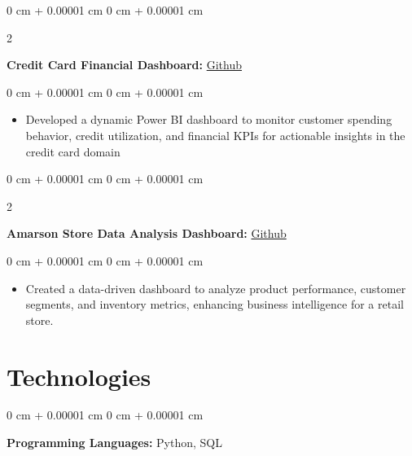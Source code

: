 \documentclass[10pt, letterpaper]{article}
\newenvironment{highlights}{
    \begin{itemize}[
        topsep=0.10 cm,
        parsep=0.10 cm,
        partopsep=0pt,
        itemsep=0pt,
        leftmargin=0 cm + 10pt
    ]
}{
    \end{itemize}
} %
\newenvironment{onecolentry}{
    \begin{adjustwidth}{
        0 cm + 0.00001 cm
    }{
        0 cm + 0.00001 cm
    }
}{
    \end{adjustwidth}
} %
\newenvironment{twocolentry}[2][]{
    \onecolentry
    \def\secondColumn{#2}
    \setcolumnwidth{\fill, 4.5 cm}
    \begin{paracol}{2}
}{
    \switchcolumn \raggedleft \secondColumn
    \end{paracol}
    \endonecolentry
} %
\begin{document}
                 \vspace{2 pt}

        \begin{twocolentry}{
            \href{https://github.com/Ishan10123/Credit_Card- _Financial_Dashboard}{Github}
        }
            \textbf{Credit Card Financial Dashboard:}\end{twocolentry}

        \vspace{0.10 cm}
        \begin{onecolentry}
            \begin{highlights}
                \item Developed a dynamic Power BI dashboard to monitor customer spending behavior, credit utilization, and financial KPIs for actionable insights in the credit card domain
            \end{highlights}
        \end{onecolentry}

                 \vspace{2 pt}

        \begin{twocolentry}{
            \href{https://github.com/Ishan10123/Amarson_Store_ Data_Analysis_Dashboard}{Github}
        }
            \textbf{Amarson Store Data Analysis Dashboard:}\end{twocolentry}

        \vspace{0.10 cm}
        \begin{onecolentry}
            \begin{highlights}
                \item Created a data-driven dashboard to analyze product performance, customer segments, and inventory metrics, enhancing business intelligence for a retail store.
            \end{highlights}
        \end{onecolentry}

  \vspace{5 pt}

    
    \section{Technologies}



        
        \begin{onecolentry}
            \textbf{Programming Languages:} Python, SQL
        \end{onecolentry}
\end{document}
